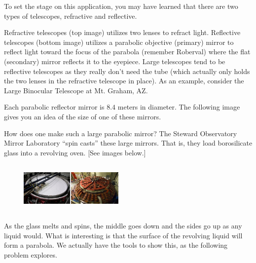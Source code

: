 To set the stage on this application, you may have learned that there
are two types of telescopes, refractive and reflective.

Refractive telescopes (top image) utilizes two lenses to refract
light.  Reflective telescopes (bottom image) utilizes a parabolic
objective (primary) mirror to reflect light toward the focus of the
parabola (remember Roberval) where the flat (secondary) mirror
reflects it to the eyepiece.  Large telescopes tend to be reflective
telescopes as they really don't need the tube (which actually only
holds the two lenses in the refractive telescope in place).  As an
example, consider the Large Binocular Telescope at Mt. Graham, AZ. 

Each parabolic reflector mirror is $8.4$ meters in diameter.  The
following image gives you an idea of the size of one of these mirrors.

How does one make such a large parabolic mirror?  The Steward
Observatory Mirror Laboratory ``spin casts'' these large mirrors.  That
is, they load borosilicate glass into a revolving oven.  [See images
below.]   

\begin{figure}
\captionsetup{labelformat=empty}
\centerline{\includegraphics*[height=1in,width=2in]{Figures/SpinCasting2}}
\label{fig:}
\end{figure}
As the glass melts and spins, the middle goes down and the sides go up
as any liquid would.  What is interesting is that the surface of the
revolving liquid will form a parabola.  We actually have the tools to
show this, as the following problem explores.    

